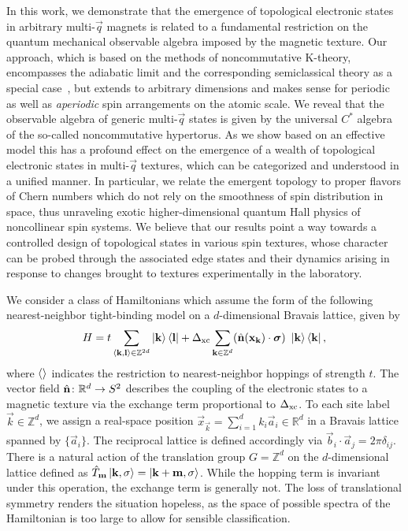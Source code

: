 \documentclass[
    aps,
    prl,
    twocolumn,
    floatfix,
    superscriptaddress
]{revtex4-2}
\begin{document}
In this work, we demonstrate that the emergence of topological electronic states in arbitrary multi-$\vec{q}$ magnets is related to a fundamental restriction on the quantum mechanical observable algebra imposed by the magnetic texture. 
Our approach, which is based on the methods of noncommutative K-theory, encompasses the adiabatic limit and the corresponding semiclassical theory as a special case~\cite{Su2020}, but extends 
to arbitrary dimensions and makes sense for periodic as well as {\it aperiodic} spin arrangements on the atomic scale.
We reveal that the observable algebra of generic multi-$\vec{q}$ states is given by the universal $C^\ast$ algebra of the so-called noncommutative hypertorus. As we show based on an effective model  this has a profound effect on the emergence of a wealth of topological electronic states in multi-$\vec{q}$ textures, which can be categorized and understood in a unified manner. 
In particular, we relate the emergent topology to proper flavors of Chern numbers which do not rely on the smoothness of spin distribution in space, thus unraveling  exotic higher-dimensional quantum Hall physics of noncollinear spin systems.
We believe that our results point a way towards a controlled design of topological states in various spin textures, whose character can be probed through the associated edge states and their dynamics arising in response to changes brought to textures experimentally in the laboratory. 



We consider a class of Hamiltonians which assume the form of the following nearest-neighbor tight-binding model on a $d$-dimensional Bravais lattice, given by
\begin{align}
    H  = t \sum_{\braket{\mathbf{k},\mathbf{l}} \in \mathbb{Z}^{2d}} \ket{\mathbf{k}}\bra{\mathbf{l}}
    + \Delta_\mathrm{xc}\sum_{\mathbf{k} \in \mathbb{Z}^d}  (\hat{\mathbf{n}} (\mathbf{x}_{\mathbf{k}}) \cdot \boldsymbol{\sigma}) ~ \ket{\mathbf{k}}\bra{\mathbf{k}} ,
    \label{eq:hamiltonian}
\end{align}
where $\braket{}$ indicates the restriction to nearest-neighbor hoppings of strength $t$.
The vector field $\hat{\mathbf{n}}\colon \mathbb{R}^d \to S^2$ describes the coupling of the electronic states to a magnetic texture via the exchange term proportional to $\Delta_\mathrm{xc}$. 
To each site label $\vec{k} \in \mathbb{Z}^d$, we assign a real-space position $\vec{x}_\vec{k} = \sum_{i=1}^d k_i \vec{a}_i \in \mathbb{R}^d$ in a Bravais lattice spanned by $\lbrace \vec{a}_i \rbrace$. 
The reciprocal lattice is defined accordingly via $ \vec{b}_i \cdot \vec{a}_j  = 2\pi \delta_{ij}$.
There is a natural action of the translation group $G = \mathbb{Z}^d$ on the $d$-dimensional lattice defined as
$
    \hat{T}_{\mathbf{m}} \ket{\mathbf{k}, \sigma}  =  \ket{\mathbf{k}+ \mathbf{m}, \sigma}
$.
While the hopping term is invariant under this operation, the exchange term is generally not.
The loss of translational symmetry renders the situation hopeless, as the space of possible spectra of the Hamiltonian is too large to allow for sensible classification.
\end{document}
